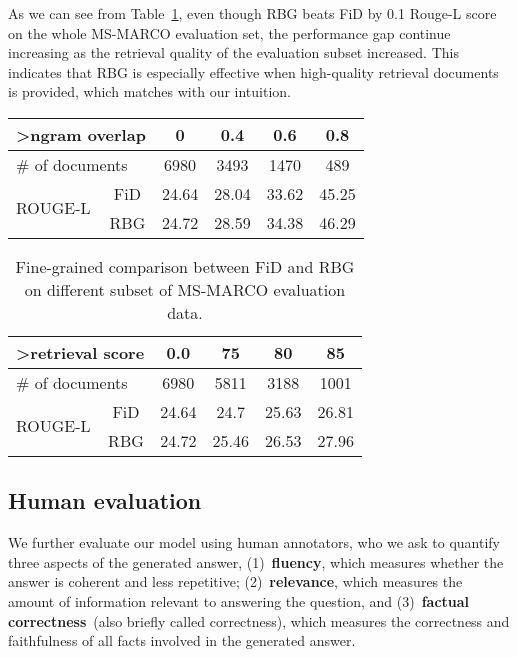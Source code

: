 \documentclass[11pt]{article}
\begin{document}
As we can see from Table~\ref{tab:FidvsRBG}, even though RBG beats FiD by 0.1 Rouge-L score on the whole MS-MARCO evaluation set, the performance gap continue increasing as the retrieval quality of the evaluation subset increased. This indicates that RBG is especially effective when high-quality retrieval documents is provided, which matches with our intuition. 

\begin{table}[!h]
\resizebox{0.45\textwidth}{!}
{
\centering
\begin{tabular}{lc|cccc}
\hline
\multicolumn{2}{l|}{>ngram overlap} & 0     & 0.4        & 0.6       & 0.8    \\ \hline
\multicolumn{2}{l|}{\# of documents} & 6980  & 3493      & 1470      & 489    \\ \hline
\multirow{2}{*}{ROUGE-L}    & FiD    & 24.64 & 28.04  & 33.62  & 45.25 \\
                            & RBG    & 24.72 & 28.59  & 34.38   & 46.29  \\ \hline
\end{tabular}
}
\end{table}
\vspace{-20pt}
\begin{table}[!h]
\resizebox{0.45\textwidth}{!}
{
\begin{tabular}{lc|cccc}
\hline
\multicolumn{2}{l|}{\textgreater{}retrieval score} & 0.0   & 75    & 80    & 85    \\ \hline
\multicolumn{2}{l|}{\# of documents}               & 6980  & 5811  & 3188  & 1001  \\ \hline
\multirow{2}{*}{ROUGE-L}           & FiD           & 24.64 & 24.7  & 25.63 & 26.81 \\
                                   & RBG           & 24.72 & 25.46 & 26.53 & 27.96 \\ \hline
\end{tabular}
}
\vspace{-5pt}
\caption{Fine-grained comparison between FiD and RBG on different subset of MS-MARCO evaluation data.}
\label{tab:FidvsRBG}
\vspace{-10pt}
\end{table}



\vspace{-10pt}
\subsection{Human evaluation} 
We further evaluate our model using human annotators, who we ask to quantify three aspects of the generated answer, (1)~\textbf{fluency}, which measures whether the answer is coherent and less repetitive; (2)~\textbf{relevance}, which measures the amount of information relevant to answering the question, and (3)~\textbf{factual correctness}~(also briefly called correctness), which measures the correctness and faithfulness of all facts involved in the generated answer.
\end{document}
